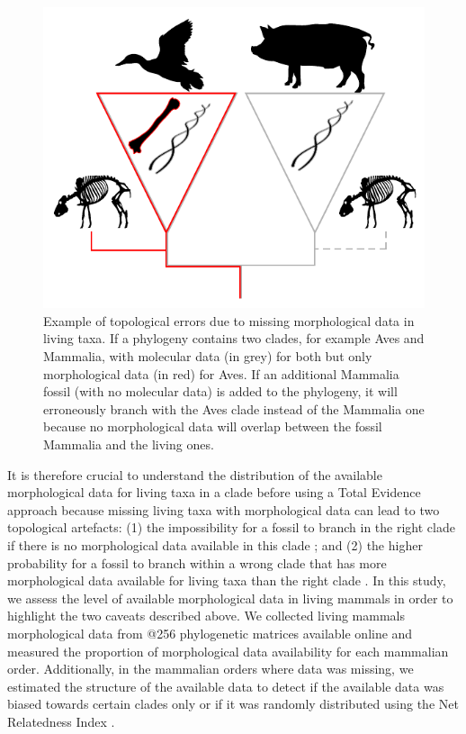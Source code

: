 \documentclass[12pt,letterpaper]{article}
\begin{document}
\begin{figure}[!htbp]
\centering
    \includegraphics[width=1\textwidth]{MissingDataFigure.pdf}
\caption{Example of topological errors due to missing morphological data in living taxa.
If a phylogeny contains two clades, for example Aves and Mammalia, with molecular data (in grey) for both but only morphological data (in red) for Aves.
If an additional Mammalia fossil (with no molecular data) is added to the phylogeny, it will erroneously branch with the Aves clade instead of the Mammalia one because no morphological data will overlap between the fossil Mammalia and the living ones.}
\label{Figure_missing_data_problem}
\end{figure}

It is therefore crucial to understand the distribution of the available morphological data for living taxa in a clade before using a Total Evidence approach because missing living taxa with morphological data can lead to two topological artefacts: (1) the impossibility for a fossil to branch in the right clade if there is no morphological data available in this clade \citep{GuillermeCooper}; and (2) the higher probability for a fossil to branch within a wrong clade that has more morphological data available for living taxa than the right clade \citep{GuillermeCooper}.
In this study, we assess the level of available morphological data in living mammals in order to highlight the two caveats described above.
We collected living mammals morphological data from @256 phylogenetic matrices available online and measured the proportion of morphological data availability for each mammalian order.
Additionally, in the mammalian orders where data was missing, we estimated the structure of the available data to detect if the available data was biased towards certain clades only or if it was randomly distributed using the Net Relatedness Index \citep{webb2002phylogenies}.
\end{document}
